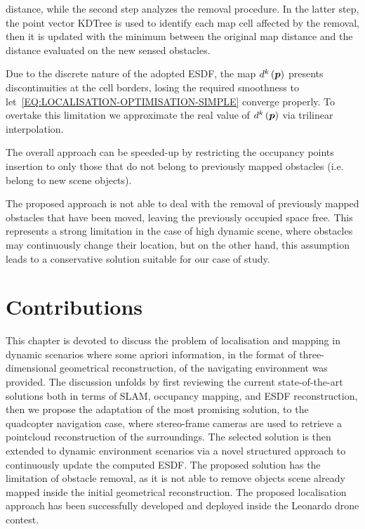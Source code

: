 distance, while the second step analyzes the removal procedure.
In the latter step, the point vector KDTree is used to identify each map cell affected by the removal, then it is updated with the minimum
between the original map distance and the distance evaluated on the new sensed obstacles.
\begin{remark}
    Due to the discrete nature of the adopted ESDF, the map $d^k\left( \boldsymbol{p} \right)$ presents discontinuities at the cell borders, losing the
    required smoothness to let~\eqref{EQ:LOCALISATION-OPTIMISATION-SIMPLE} converge properly.
    To overtake this limitation we approximate the real value of $d^k\left( \boldsymbol{p} \right)$ via trilinear interpolation.
\end{remark}
\begin{remark}
    The overall approach can be speeded-up by restricting the occupancy points insertion to only those that do not belong to previously mapped obstacles
    (i.e. belong to new scene objects).
\end{remark}
\begin{remark}
    The proposed approach is not able to deal with the removal of previously mapped obstacles that have been moved, leaving the previously occupied
    space free. This represents a strong limitation in the case of high dynamic scene, where obstacles may continuously change their location, but
    on the other hand, this assumption leads to a conservative solution suitable for our case of study.
\end{remark}

\section{Contributions}
This chapter is devoted to discuss the problem of localisation and mapping in dynamic scenarios where some apriori information,
in the format of three-dimensional geometrical reconstruction, of the navigating environment was provided.
The discussion unfolds by first reviewing the current state-of-the-art solutions both in terms of SLAM, occupancy mapping, and ESDF reconstruction,
then we propose the adaptation of the most promising solution, to the quadcopter navigation case, where stereo-frame cameras are used to 
retrieve a pointcloud reconstruction of the surroundings. The selected solution is then extended to dynamic environment scenarios via
a novel structured approach to continuously update the computed ESDF. The proposed solution has the limitation of obstacle removal, as it
is not able to remove objects scene already mapped inside the initial geometrical reconstruction.
The proposed localisation approach has been successfully developed and deployed inside the Leonardo drone contest.

